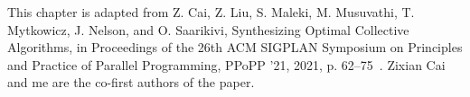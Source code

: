 \newcommand{\broadcasting}{non-com\-bin\-ing\xspace}
\newcommand{\broadcastingCap}{Non-com\-bin\-ing\xspace}
\newcommand{\reducing}{com\-bin\-ing\xspace}
\newcommand{\reducingCap}{Com\-bin\-ing\xspace}

\newcommand{\etal}{\textit{et al}.}

This chapter is adapted from Z. Cai, Z. Liu, S. Maleki, M. Musuvathi, T. Mytkowicz, J. Nelson, and
O. Saarikivi, Synthesizing Optimal Collective Algorithms, in Proceedings of the 26th
ACM SIGPLAN Symposium on Principles and Practice of Parallel Programming, PPoPP ’21, 2021, p. 62–75~\cite{sccl}.
Zixian Cai and me are the co-first authors of the paper.









